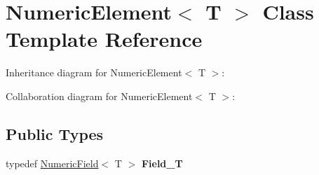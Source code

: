 \hypertarget{classNumericElement}{}\section{Numeric\+Element$<$ T $>$ Class Template Reference}
\label{classNumericElement}


Inheritance diagram for Numeric\+Element$<$ T $>$\+:


Collaboration diagram for Numeric\+Element$<$ T $>$\+:
\subsection*{Public Types}
\begin{DoxyCompactItemize}
\item 
typedef \hyperlink{classNumericField}{Numeric\+Field}$<$ T $>$ {\bfseries Field\+\_\+T}\hypertarget{classNumericElement_a2eb88b95be95d26b1b85cdbaeeb204fa}{}\label{classNumericElement_a2eb88b95be95d26b1b85cdbaeeb204fa}

\end{DoxyCompactItemize}
